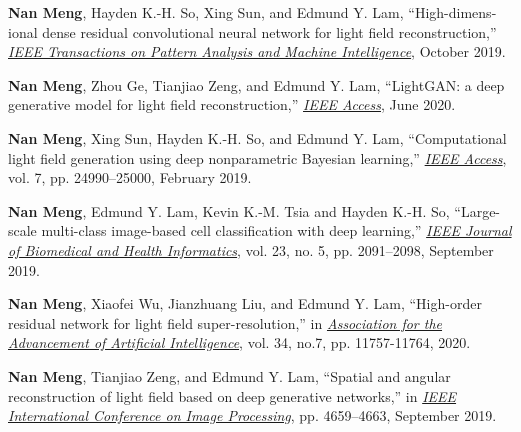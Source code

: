 \begin{publications}
\newcommand{\JourConfTitle}[1]{\ul{\emph{#1}}}


\begin{journals}
\item \textbf{Nan Meng}, Hayden K.-H. So, Xing Sun, and Edmund Y. Lam, ``High-dimens-ional dense residual convolutional neural network for light field reconstruction,'' \JourConfTitle{IEEE Transactions on Pattern Analysis and Machine Intelligence}, October 2019.

\item \textbf{Nan Meng}, Zhou Ge, Tianjiao Zeng, and Edmund Y. Lam, ``LightGAN: a deep generative model for light field reconstruction,'' \JourConfTitle{IEEE Access}, June 2020.

\item \textbf{Nan Meng}, Xing Sun, Hayden K.-H. So, and Edmund Y. Lam, ``Computational light field generation using deep nonparametric Bayesian learning,'' \JourConfTitle{IEEE Access}, vol. 7, pp. 24990--25000, February 2019.

\item \textbf{Nan Meng}, Edmund Y. Lam, Kevin K.-M. Tsia and Hayden K.-H. So, ``Large-scale multi-class image-based cell classification with deep learning,'' \JourConfTitle{IEEE Journal of Biomedical and Health Informatics}, vol. 23, no. 5, pp. 2091--2098, September 2019. 
\end{journals}


\begin{conferences}
\item \textbf{Nan Meng}, Xiaofei Wu, Jianzhuang Liu, and Edmund Y. Lam, ``High-order residual network for light field super-resolution,'' in \JourConfTitle{Association for the Advancement of Artificial Intelligence}, vol. 34, no.7, pp. 11757-11764, 2020.

\item \textbf{Nan Meng}, Tianjiao Zeng, and Edmund Y. Lam, ``Spatial and angular reconstruction of light field based on deep generative networks,'' in \JourConfTitle{IEEE International Conference on Image Processing}, pp. 4659–4663, September 2019.


\end{conferences}
\end{publications}
